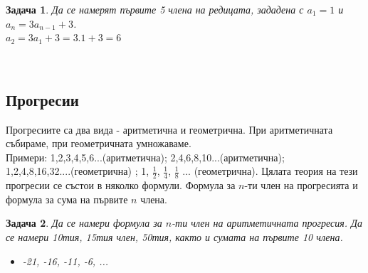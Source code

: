 \documentclass{article}
\newtheorem{problem}{Задача}
\begin{document}
\begin{problem} Да се намерят първите 5 члена на редицата, зададена с
	$a_1 = 1 $ и	$a_n = 3a_{n-1} + 3 $. \\
	
	
	  $a_2 = 3a_1 + 3 = 3.1 + 3 = 6 $
	  
	  
\end{problem}
$ $


\subsection{Прогресии}

Прогресиите са два вида - аритметична и геометрична. При аритметичната събираме, при геометричната умножаваме. \\
Примери: 1,2,3,4,5,6...(аритметична); 2,4,6,8,10...(аритметична); \\ 1,2,4,8,16,32....(геометрична) ; 1, $\frac{1}{2}$, $\frac{1}{4}$, $\frac{1}{8}$ ... (геометрична).
Цялата теория на тези прогресии се състои в няколко формули. Формула за $n$-ти член на прогресията и формула за сума на първите $n$ члена.

\begin{problem}
	Да се намери формула за $n$-ти член на аритметичната прогресия. Да се намери 10тия, 15тия член, 50тия, както и сумата на първите 10 члена.
	\begin{itemize}
		\item -21, -16, -11, -6, ...
		
	\end{itemize}
\end{problem}
\end{document}
